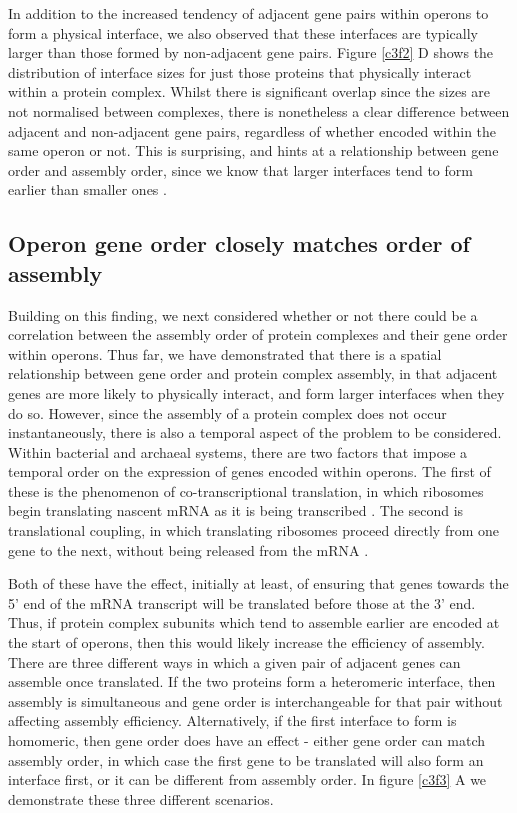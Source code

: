 \documentclass[a4paper,11pt,twoside,openright]{scrbook}
\begin{document}
In addition to the increased tendency of adjacent gene pairs within operons to form a physical interface, we also observed that these interfaces are typically larger than those formed by non-adjacent gene pairs. Figure \ref{c3f2} D shows the distribution of interface sizes for just those proteins that physically interact within a protein complex. Whilst there is significant overlap since the sizes are not normalised between complexes, there is nonetheless a clear difference between adjacent and non-adjacent gene pairs, regardless of whether encoded within the same operon or not. This is surprising, and hints at a relationship between gene order and assembly order, since we know that larger interfaces tend to form earlier than smaller ones \cite{Levy2008,Marsh2013,Macek2017}.

\subsection{Operon gene order closely matches order of assembly}
Building on this finding, we next considered whether or not there could be a correlation between the assembly order of protein complexes and their gene order within operons. Thus far, we have demonstrated that there is a spatial relationship between gene order and protein complex assembly, in that adjacent genes are more likely to physically interact, and form larger interfaces when they do so. However, since the assembly of a protein complex does not occur instantaneously, there is also a temporal aspect of the problem to be considered. Within bacterial and archaeal systems, there are two factors that impose a temporal order on the expression of genes encoded within operons. The first of these is the phenomenon of co-transcriptional translation, in which ribosomes begin translating nascent mRNA as it is being transcribed \cite{Byrne1964,Gowrishankar2004,Kohler2017}. The second is translational coupling, in which translating ribosomes proceed directly from one gene to the next, without being released from the mRNA \cite{Oppenheim1980,Levin-Karp2013}.

Both of these have the effect, initially at least, of ensuring that genes towards the 5' end of the mRNA transcript will be translated before those at the 3' end. Thus, if protein complex subunits which tend to assemble earlier are encoded at the start of operons, then this would likely increase the efficiency of assembly. There are three different ways in which a given pair of adjacent genes can assemble once translated. If the two proteins form a heteromeric interface, then assembly is simultaneous and gene order is interchangeable for that pair without affecting assembly efficiency. Alternatively, if the first interface to form is homomeric, then gene order does have an effect - either gene order can match assembly order, in which case the first gene to be translated will also form an interface first, or it can be different from assembly order. In figure \ref{c3f3} A we demonstrate these three different scenarios.
\end{document}

